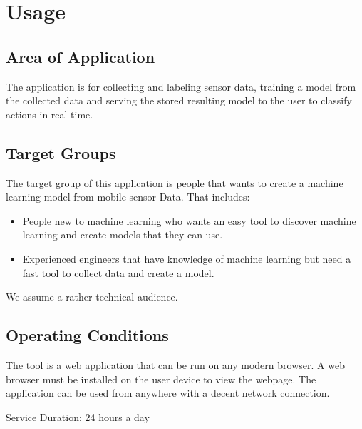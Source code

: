 \section{Usage}
\subsection{Area of Application}
The application is for collecting and labeling sensor data, training a model from the collected data and serving the stored resulting model to the user to classify actions in real time.

\subsection{Target Groups}
The target group of this application is people that wants to create a machine learning model from mobile sensor Data.
That includes: 
\begin{itemize}
    \item People new to machine learning who wants an easy tool to discover machine learning and create models that they can use.
    \item Experienced engineers that have knowledge of machine learning but need a fast tool to collect data and create a model.
\end{itemize}
We assume a rather technical audience. %

\subsection{Operating Conditions}
The tool is a web application that can be run on any modern browser. A web browser must be installed on the user device to view the webpage. The application can be used from anywhere with a decent network connection.

Service Duration: 24 hours a day
